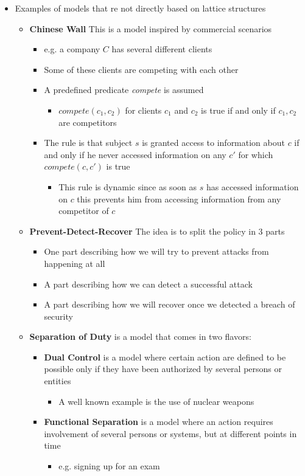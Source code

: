 \documentclass[11pt]{article}
\begin{document}
\begin{itemize}
\item Examples of models that re not directly based on lattice structures
\begin{itemize}
\item \textbf{Chinese Wall} This is a model inspired by commercial scenarios
\begin{itemize}
\item e.g. a company \(C\) has several different clients
\item Some of these clients are competing with each other
\item A predefined predicate \emph{compete} is assumed
\begin{itemize}
\item \(compete(c_1,c_2)\) for clients \(c_1\) and \(c_2\) is true if and only if \(c_1,c_2\) are competitors
\end{itemize}
\item The rule is that subject \(s\) is granted access to information about \(c\) if and only if he never accessed information on any \(c'\) for which \(compete(c, c')\) is true
\begin{itemize}
\item This rule is dynamic since as soon as \(s\) has accessed information on \(c\) this prevents him from accessing information from any competitor of \(c\)
\end{itemize}
\end{itemize}
\item \textbf{Prevent-Detect-Recover} The idea is to split the policy in 3 parts
\begin{itemize}
\item One part describing how we will try to prevent attacks from happening at all
\item A part describing how we can detect a successful attack
\item A part describing how we will recover once we detected a breach of security
\end{itemize}
\item \textbf{Separation of Duty} is a model that comes in two flavors:
\begin{itemize}
\item \textbf{Dual Control} is a model where certain action are defined to be possible only if they have been authorized by several persons or entities
\begin{itemize}
\item A well known example is the use of nuclear weapons
\end{itemize}
\item \textbf{Functional Separation} is a model where an action requires involvement of several persons or systems, but at different points in time
\begin{itemize}
\item e.g. signing up for an exam
\end{itemize}
\end{itemize}
\end{itemize}
\end{itemize}
\end{document}
